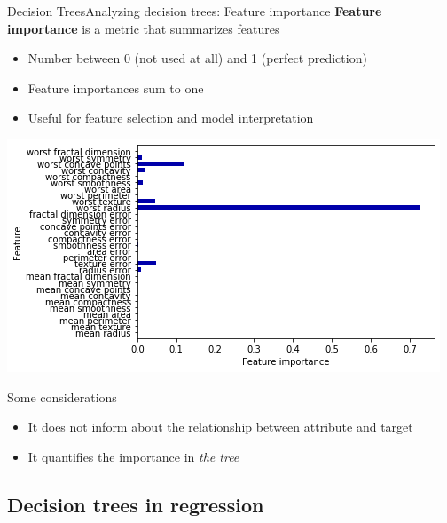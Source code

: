 \documentclass[10pt,compress]{beamer} %
\begin{document}
\begin{frame}{Decision Trees}{Analyzing decision trees: Feature importance}
    \textbf{Feature importance} is a metric that summarizes features
    \begin{itemize}
        \item Number between 0 (not used at all) and 1 (perfect prediction)
        \item Feature importances sum to one
        \item Useful for feature selection and model interpretation
    \end{itemize}

   \centering \includegraphics[width=0.5\linewidth]{figs/tree-importance.png}

   \flushleft

   \vspace{-0.5cm}

   Some considerations
   \begin{itemize}
       \item It does not inform about the relationship between attribute and target
       \item It quantifies the importance in \textit{the tree}
   \end{itemize}

\end{frame}

\subsection{Decision trees in regression}
\end{document}
